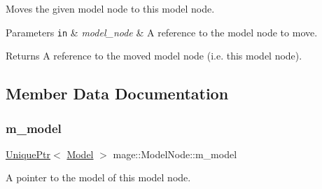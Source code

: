 Moves the given model node to this model node.


\begin{DoxyParams}[1]{Parameters}
\mbox{\tt in}  & {\em model\+\_\+node} & A reference to the model node to move. \\
\hline
\end{DoxyParams}
\begin{DoxyReturn}{Returns}
A reference to the moved model node (i.\+e. this model node). 
\end{DoxyReturn}


\subsection{Member Data Documentation}
\hypertarget{classmage_1_1_model_node_a784faf19f736a1c74808321ed0e52d36}{}\label{classmage_1_1_model_node_a784faf19f736a1c74808321ed0e52d36} 
\subsubsection{\texorpdfstring{m\+\_\+model}{m\_model}}
{\footnotesize\ttfamily \hyperlink{namespacemage_a3316d7143a973e37adf1110f2e80ca31}{Unique\+Ptr}$<$ \hyperlink{classmage_1_1_model}{Model} $>$ mage\+::\+Model\+Node\+::m\+\_\+model\hspace{0.3cm}{\ttfamily [private]}}

A pointer to the model of this model node. 